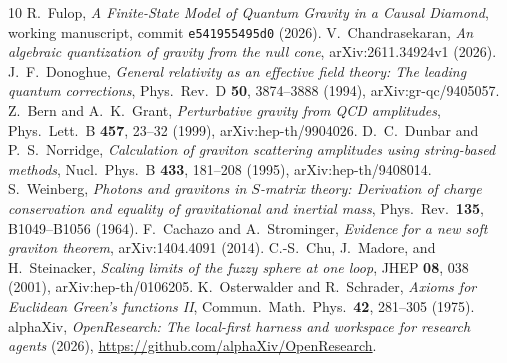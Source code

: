 \documentclass[11pt]{article}
\begin{document}
\begin{thebibliography}{10}
 R.~Fulop, \emph{A Finite-State Model of Quantum Gravity in a Causal Diamond}, working manuscript, commit \texttt{e541955495d0} (2026).
 V.~Chandrasekaran, \emph{An algebraic quantization of gravity from the null cone}, arXiv:2611.34924v1 (2026).
 J.~F.~Donoghue, \emph{General relativity as an effective field theory: The leading quantum corrections}, Phys.\ Rev.\ D \textbf{50}, 3874--3888 (1994), arXiv:gr-qc/9405057.
 Z.~Bern and A.~K.~Grant, \emph{Perturbative gravity from QCD amplitudes}, Phys.\ Lett.\ B \textbf{457}, 23--32 (1999), arXiv:hep-th/9904026.
 D.~C.~Dunbar and P.~S.~Norridge, \emph{Calculation of graviton scattering amplitudes using string-based methods}, Nucl.\ Phys.\ B \textbf{433}, 181--208 (1995), arXiv:hep-th/9408014.
 S.~Weinberg, \emph{Photons and gravitons in $S$-matrix theory: Derivation of charge conservation and equality of gravitational and inertial mass}, Phys.\ Rev.\ \textbf{135}, B1049--B1056 (1964).
 F.~Cachazo and A.~Strominger, \emph{Evidence for a new soft graviton theorem}, arXiv:1404.4091 (2014).
 C.-S.~Chu, J.~Madore, and H.~Steinacker, \emph{Scaling limits of the fuzzy sphere at one loop}, JHEP \textbf{08}, 038 (2001), arXiv:hep-th/0106205.
 K.~Osterwalder and R.~Schrader, \emph{Axioms for Euclidean Green's functions II}, Commun.\ Math.\ Phys.\ \textbf{42}, 281--305 (1975).
 alphaXiv, \emph{OpenResearch: The local-first harness and workspace for research agents} (2026), \url{https://github.com/alphaXiv/OpenResearch}.
\end{thebibliography}
\end{document}

